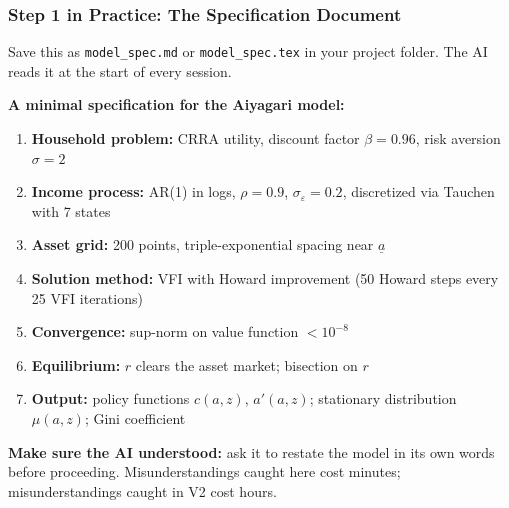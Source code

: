 \documentclass[10pt,english,aspectratio=169]{beamer}
\begin{document}
\begin{frame}
\frametitle{Step 1 in Practice: The Specification Document}

Save this as \texttt{model\_spec.md} or \texttt{model\_spec.tex} in your project folder. The AI reads it at the start of every session.

\vspace{0.2cm}

\textbf{A minimal specification for the Aiyagari model:}

\begin{enumerate}
    \item \textbf{Household problem:} CRRA utility, discount factor $\beta = 0.96$, risk aversion $\sigma = 2$
    \item \textbf{Income process:} AR(1) in logs, $\rho = 0.9$, $\sigma_\varepsilon = 0.2$, discretized via Tauchen with 7 states
    \item \textbf{Asset grid:} 200 points, triple-exponential spacing near $\underline{a}$
    \item \textbf{Solution method:} VFI with Howard improvement (50 Howard steps every 25 VFI iterations)
    \item \textbf{Convergence:} sup-norm on value function $< 10^{-8}$
    \item \textbf{Equilibrium:} $r$ clears the asset market; bisection on $r$
    \item \textbf{Output:} policy functions $c(a,z)$, $a'(a,z)$; stationary distribution $\mu(a,z)$; Gini coefficient
\end{enumerate}

\vspace{0.2cm}

\textbf{Make sure the AI understood:} ask it to restate the model in its own words before proceeding. Misunderstandings caught here cost minutes; misunderstandings caught in V2 cost hours.
\end{frame}
\end{document}
